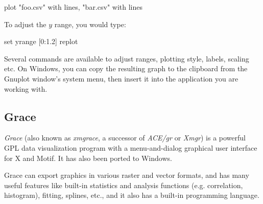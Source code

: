 \begin{commandline}
plot "foo.csv" with lines, "bar.csv" with lines
\end{commandline}

To adjust the $y$ range, you would type:

\begin{commandline}
set yrange [0:1.2]
replot
\end{commandline}

Several commands are available to adjust ranges, plotting style, labels,
scaling etc. On Windows, you can copy the resulting graph to the clipboard from
the Gnuplot window's system menu, then insert it into the application you
are working with.


\subsection{Grace}

\textit{Grace} (also known as \textit{xmgrace}, a successor of
\textit{ACE/gr} or \textit{Xmgr}) is a powerful GPL data visualization
program with a menu-and-dialog graphical user interface for X and Motif. It
has also been ported to Windows.

Grace can export graphics in various raster and vector formats, and has
many useful features like built-in statistics and analysis functions (e.g.
correlation, histogram), fitting, splines, etc., and it also has a built-in
programming language.





